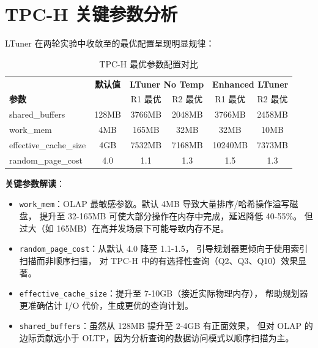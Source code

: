 
\section{TPC-H 关键参数分析}

LTuner 在两轮实验中收敛至的最优配置呈现明显规律：

\begin{table}[h]
\centering
\caption{TPC-H 最优参数配置对比}
\begin{tabular}{l|c|cc|cc}
\hline
& \textbf{默认值} & \multicolumn{2}{c|}{\textbf{LTuner No Temp}} & \multicolumn{2}{c}{\textbf{Enhanced LTuner}} \\
\textbf{参数} & & R1 最优 & R2 最优 & R1 最优 & R2 最优 \\
\hline
shared\_buffers       & 128MB  & 3766MB & 2048MB & 3766MB & 2458MB \\
work\_mem             & 4MB    & 165MB  & 32MB   & 32MB   & 10MB   \\
effective\_cache\_size & 4GB    & 7532MB & 7168MB & 10240MB & 7373MB \\
random\_page\_cost     & 4.0    & 1.1    & 1.3    & 1.5    & 1.3    \\
\hline
\end{tabular}
\end{table}

\textbf{关键参数解读}：
\begin{itemize}
  \item \texttt{work\_mem}：OLAP 最敏感参数。默认 4MB 导致大量排序/哈希操作溢写磁盘，
        提升至 32-165MB 可使大部分操作在内存中完成，延迟降低 40-55\%。
        但过大（如 165MB）在高并发场景下可能导致内存不足。
  \item \texttt{random\_page\_cost}：从默认 4.0 降至 1.1-1.5，
        引导规划器更倾向于使用索引扫描而非顺序扫描，
        对 TPC-H 中的有选择性查询（Q2、Q3、Q10）效果显著。
  \item \texttt{effective\_cache\_size}：提升至 7-10GB（接近实际物理内存），
        帮助规划器更准确估计 I/O 代价，生成更优的查询计划。
  \item \texttt{shared\_buffers}：虽然从 128MB 提升至 2-4GB 有正面效果，
        但对 OLAP 的边际贡献远小于 OLTP，因为分析查询的数据访问模式以顺序扫描为主。
\end{itemize}



